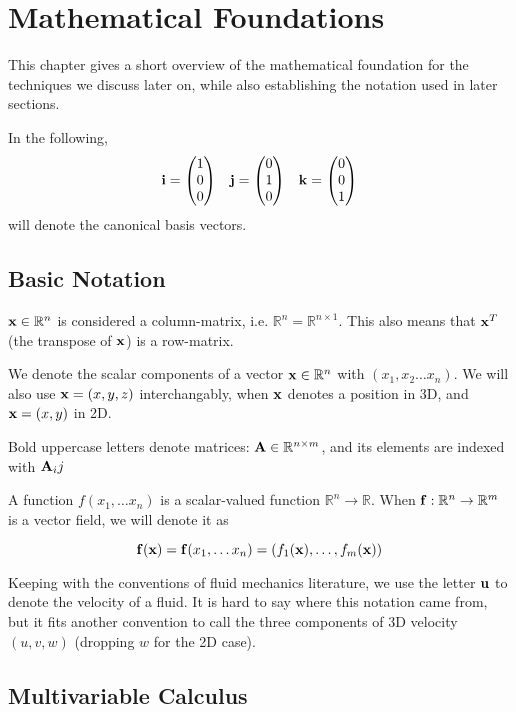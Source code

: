 \chapter{Mathematical Foundations}
\label{sec:mathematicalFoundations}
This chapter gives a short overview of the mathematical foundation for the
techniques we discuss later on, while also establishing the notation used in
later sections.

In the following,
\begin{equation*}
    \vb{i} = \mqty( 1 \\ 0 \\ 0 )\quad
    \vb{j} = \mqty( 0 \\ 1 \\ 0 )\quad
    \vb{k} = \mqty( 0 \\ 0 \\ 1 )
\end{equation*}
will denote the canonical basis vectors.

\section{Basic Notation}

$\vb{x} \in \mathbb{R}^n$ is considered a column-matrix, i.e. $\mathbb{R}^n
= \mathbb{R}^{n \times 1}$. This also means that $\vb{x}^T$ (the transpose of
$\vb{x}$) is a row-matrix.

We denote the scalar components of a vector $\vb{x}\in \mathbb{R}^{n}$ with $(x_1,
x_2 \dots x_n)$. We will also use $\vb{x} = (x,y,z)$ interchangably, when
$\vb{x}$ denotes a position in 3D, and $\vb{x} = (x,y)$ in 2D.

Bold uppercase letters denote matrices: $\vb{A}\in \mathbb{R}^{n \times m}$, and
its elements are indexed with $\vb{A}_ij$

A function $f(x_1, \dots x_n)$ is a scalar-valued function $\mathbb{R}^n \to
\mathbb{R}$.  When $\vb{f}: \mathbb{R}^n \to \mathbb{R}^m$ is a vector field, we
will denote it as 

$$\vb{f}(\vb{x}) = \vb{f}(x_1,\dots x_n) =(f_1(\vb{x}), \dots, f_m(\vb{x}))$$

Keeping with the conventions of fluid mechanics literature, we use the letter
$\vb{u}$ to denote the velocity of a fluid. It is hard to say where this notation
came from, but it fits another convention to call the three components of 3D
velocity $(u,v,w)$ (dropping $w$ for the 2D case).

\section{Multivariable Calculus}
